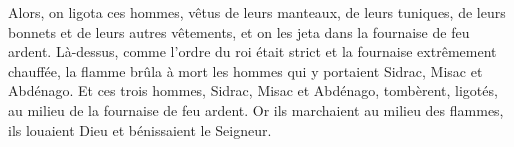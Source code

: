 Alors, on ligota ces hommes, vêtus de leurs manteaux, de leurs tuniques,
		de leurs bonnets et de leurs autres vêtements,
	et on les jeta dans la fournaise de feu ardent.
Là-dessus, comme l’ordre du roi était strict et la fournaise extrêmement chauffée,
	la flamme brûla à mort les hommes qui y portaient Sidrac, Misac et Abdénago.
Et ces trois hommes, Sidrac, Misac et Abdénago,
	tombèrent, ligotés, au milieu de la fournaise de feu ardent.
Or ils marchaient au milieu des flammes, ils louaient Dieu et bénissaient le Seigneur.
